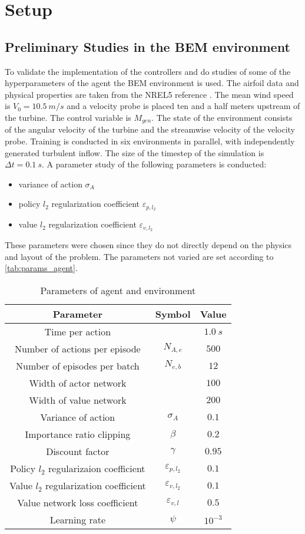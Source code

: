 \section{Setup}
\subsection{Preliminary Studies in the BEM environment}
To validate the implementation of the controllers and do studies of some of the hyperparameters of the agent the BEM environment is used. The airfoil data and physical properties are taken from the NREL5 reference \cite{jonkman_definition_2009}. The mean wind speed is $V_0=\SI{10.5}{m/s}$ and a velocity probe is placed ten and a half meters upstream of the turbine.
The control variable is $M_{gen}$. The state of the environment consists of the angular velocity of the turbine and the streamwise velocity of the velocity probe. Training is conducted in six environments in parallel, with independently generated turbulent inflow. The size of the timestep of the simulation is $\Delta t = \SI{0.1}{s}$.
A parameter study of the following parameters is conducted:
\begin{itemize}
	\item variance of action $\sigma_A$
	\item policy $l_2$ regularization coefficient $\varepsilon_{p,l_2}$
	\item value $l_2$ regularization coefficient $\varepsilon_{v,l_2}$
\end{itemize}
These parameters were chosen since they do not directly depend on the physics and layout of the problem. The parameters not varied are set according to \autoref{tab:params_agent}.
\begin{table}[h]
	\centering
	\caption{Parameters of agent and environment}
	\begin{tabular}{|c|c|c|}
		\hline
		Parameter & Symbol & Value \\
		\hline \hline
		Time per action & & $\SI{1.0}{s}$ \\ \hline
		Number of actions per episode & $N_{A,e}$ & $500$ \\ \hline
		Number of episodes per batch & $N_{e,b}$ & $12$ \\ \hline
		Width of actor network & & $100$ \\ \hline
		Width of value network & & $200$ \\ \hline
		Variance of action & $\sigma_A$ & $0.1$ \\ \hline
		Importance ratio clipping & $\beta$ & $0.2$ \\ \hline
		Discount factor & $\gamma$ & $0.95$ \\ \hline
		Policy $l_2$ regularizaion coefficient & $\varepsilon_{p,l_2} $ & $0.1$ \\ \hline
		Value $l_2$ regularization coefficient & $\varepsilon_{v,l_2}$ & $0.1$ \\ \hline
		Value network loss coefficient & $\varepsilon_{v,l}$ & $0.5$ \\ \hline
		Learning rate & $\psi$ & $10^{-3}$ \\
		\hline 
	\end{tabular}
	\label{tab:params_agent}
\end{table}
